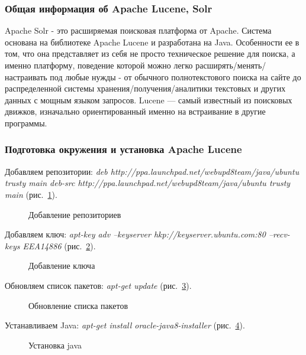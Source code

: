 \subsubsection{Общая информация об Apache Lucene, Solr}

Apache Solr - это расширяемая поисковая платформа от Apache. Система основана на библиотеке Apache Lucene и разработана на Java. Особенности ее в том, что она представляет из себя не просто техническое решение для поиска, а именно платформу, поведение которой можно легко расширять/менять/настраивать под любые нужды - от обычного полнотекстового поиска на сайте до распределенной системы хранения/получения/аналитики текстовых и других данных с мощным языком запросов. Lucene — самый известный из поисковых движков, изначально ориентированный именно на встраивание в другие программы.

\subsubsection{Подготовка окружения и установка Apache Lucene}
Добавляем репозитории:
\textit
{
deb http://ppa.launchpad.net/webupd8team/java/ubuntu trusty main
deb-src http://ppa.launchpad.net/webupd8team/java/ubuntu trusty main
} (рис.~\ref{ship_9:ship_9}).

\begin{figure}[h!]
\caption{Добавление репозиториев}
\label{ship_9:ship_9}
\end{figure}

Добавляем ключ:
  \textit{
apt-key adv --keyserver hkp://keyserver.ubuntu.com:80 --recv-keys EEA14886
} (рис.~\ref{ship_10:ship_10}).

\begin{figure}[h!]
\caption{Добавление ключа}
\label{ship_10:ship_10}
\end{figure}

Обновляем список пакетов:
\textit
{
apt-get update
} (рис.~\ref{ship_11:ship_11}).

\begin{figure}[h!]
\caption{Обновление списка пакетов}
\label{ship_11:ship_11}
\end{figure}

Устанавливаем Java:
\textit
{
apt-get install oracle-java8-installer
} (рис.~\ref{ship_12:ship_12}).

\begin{figure}[h!]
\caption{Установка java}
\label{ship_12:ship_12}
\end{figure}

